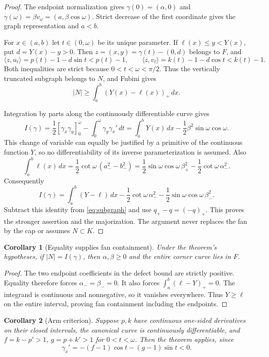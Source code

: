 \documentclass[11pt]{article}
\newtheorem{corollary}{Corollary}
\newcommand{\ip}[2]{\langle #1,#2\rangle}
\begin{document}
\begin{proof}
The endpoint normalization gives $\gamma(0)=(\alpha,0)$ and $\gamma(\omega)=\beta v_\omega=(a,\beta\cos\omega)$. Strict decrease of the first coordinate gives the graph representation and $a<b$.

For $x\in(a,b)$ let $t\in(0,\omega)$ be its unique parameter. If $\ell(x)\le y<Y(x)$, put $d=Y(x)-y>0$. Then $z=(x,y)=\gamma(t)-(0,d)$ belongs to $F$, and
\[
 \ip z{u_t}=p(t)-1-d\sin t<p(t)-1,\qquad
 \ip z{v_t}=k(t)-1-d\cos t<k(t)-1.
\]
Both inequalities are strict because $0<t<\omega<\pi/2$. Thus the vertically truncated subgraph belongs to $N$, and Fubini gives
\begin{equation}\label{eq:subgraph}
 |N|\ge\int_a^b(Y(x)-\ell(x))_+\,dx.
\end{equation}

Integration by parts along the continuously differentiable curve gives
\[
 I(\gamma)=\frac12[\gamma_x\gamma_y]_0^\omega-\int_0^\omega\gamma_y\gamma_x'\,dt
 =\int_a^bY(x)\,dx-\frac12\beta^2\sin\omega\cos\omega.
\]
This change of variable can equally be justified by a primitive of the continuous function $Y$, so no differentiability of its inverse parameterization is assumed. Also
\[
 \int_a^b\ell(x)\,dx
 =\frac12\cot\omega\,(a_-^2-b_-^2)
 =\frac12\sin\omega\cos\omega\,\beta_+^2
  -\frac12\cot\omega\,\alpha_-^2.
\]
Consequently
\[
 I(\gamma)=\int_a^b(Y-\ell)\,dx
 -\frac12\cot\omega\,\alpha_-^2
 -\frac12\sin\omega\cos\omega\,\beta_-^2.
\]
Subtract this identity from \eqref{eq:subgraph} and use $q_+-q=(-q)_+$. This proves the stronger assertion and the majorization. The argument never replaces the fan by the cap or assumes $N\subset K$.
\end{proof}

\begin{corollary}[Equality supplies fan containment]
Under the theorem's hypotheses, if $|N|=I(\gamma)$, then $\alpha,\beta\ge0$ and the entire corner curve lies in $F$.
\end{corollary}
\begin{proof}
The two endpoint coefficients in the defect bound are strictly positive. Equality therefore forces $\alpha_-=\beta_-=0$. It also forces $\int_a^b(\ell-Y)_+=0$. The integrand is continuous and nonnegative, so it vanishes everywhere. Thus $Y\ge\ell$ on the entire interval, proving fan containment including the endpoints.
\end{proof}

\begin{corollary}[Arm criterion]
Suppose $p,k$ have continuous one-sided derivatives on their closed intervals, the canonical curve is continuously differentiable, and $f=k-p'>1$, $g=p+k'>1$ for $0<t<\omega$. Then the theorem applies, since
\[
 \gamma_x'=-(f-1)\cos t-(g-1)\sin t<0.
\]
\end{corollary}
\end{document}
